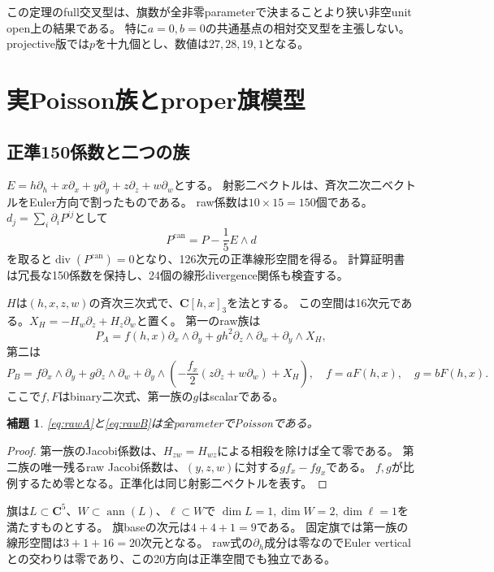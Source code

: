 \documentclass[11pt,a4paper]{ltjsarticle}
\newcommand{\CC}{\mathbf C}
\newcommand{\Div}{\operatorname{div}}
\newtheorem{lemma}[theorem]{補題}
\theoremstyle{definition}
\theoremstyle{remark}
\begin{document}
この定理のfull交叉型は、旗数が全非零parameterで決まることより狭い非空unit open上の結果である。
特に$a=0,b=0$の共通基点の相対交叉型を主張しない。
projective版では$p$を十九個とし、数値は$27,28,19,1$となる。

\section{実Poisson族とproper旗模型}

\subsection{正準150係数と二つの族}

$E=h\partial_h+x\partial_x+y\partial_y+z\partial_z+w\partial_w$とする。
射影二ベクトルは、斉次二次二ベクトルをEuler方向で割ったものである。
raw係数は$10\times15=150$個である。
$d_j=\sum_i\partial_iP^{ij}$として
\[
 P^{\mathrm{can}}=P-\frac15E\wedge d
\]
を取ると$\Div(P^{\mathrm{can}})=0$となり、126次元の正準線形空間を得る。
計算証明書は冗長な150係数を保持し、24個の線形divergence関係も検査する。

$H$は$(h,x,z,w)$の斉次三次式で、$\CC[h,x]_3$を法とする。
この空間は16次元である。$X_H=-H_w\partial_z+H_z\partial_w$と置く。
第一のraw族は
\begin{equation}\label{eq:rawA}
 P_A=f(h,x)\partial_x\wedge\partial_y
       +g h^2\partial_z\wedge\partial_w+\partial_y\wedge X_H,
\end{equation}
第二は
\begin{equation}\label{eq:rawB}
 P_B=f\partial_x\wedge\partial_y+g\partial_z\wedge\partial_w
 +\partial_y\wedge\left(-\frac{f_x}{2}(z\partial_z+w\partial_w)+X_H\right),
 \quad f=aF(h,x),\quad g=bF(h,x).
\end{equation}
ここで$f,F$はbinary二次式、第一族の$g$はscalarである。

\begin{lemma}
\eqref{eq:rawA}と\eqref{eq:rawB}は全parameterでPoissonである。
\end{lemma}
\begin{proof}
第一族のJacobi係数は、$H_{zw}=H_{wz}$による相殺を除けば全て零である。
第二族の唯一残るraw Jacobi係数は、$(y,z,w)$に対する$g f_x-f g_x$である。
$f,g$が比例するため零となる。正準化は同じ射影二ベクトルを表す。
\end{proof}

旗は$L\subset\CC^5$、$W\subset\operatorname{ann}(L)$、$\ell\subset W$で
$\dim L=1,\dim W=2,\dim\ell=1$を満たすものとする。
旗baseの次元は$4+4+1=9$である。
固定旗では第一族の線形空間は$3+1+16=20$次元となる。
raw式の$\partial_h$成分は零なのでEuler verticalとの交わりは零であり、この20方向は正準空間でも独立である。
\end{document}
